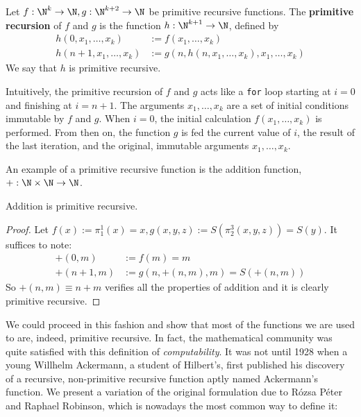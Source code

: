 \documentclass[../main.tex]{memoir}
\begin{document}
\begin{definition}
  Let $f: \N^k \to \N, g: \N^{k + 2} \to \N$ be primitive recursive functions. The \textbf{primitive recursion} of $f$ and $g$ is the function $h: \N^{k + 1} \to \N$, defined by
  \begin{align*}
    h(0, x_1, \ldots, x_k) & := f(x_1, \ldots, x_k) \\
    h(n + 1, x_1, \ldots, x_k) & := g(n, h(n, x_1, \ldots, x_k), x_1, \ldots, x_k)
  \end{align*}
  We say that $h$ is primitive recursive.
\end{definition}

\begin{remark}
  Intuitively, the primitive recursion of $f$ and $g$ acts like a \texttt{for} loop starting at $i = 0$ and finishing at $i = n + 1$. The arguments $x_1, \ldots, x_k$ are a set of initial conditions immutable by $f$ and $g$. When $i = 0$, the initial calculation $f(x_1, \ldots, x_k)$ is performed. From then on, the function $g$ is fed the current value of $i$, the result of the last iteration, and the original, immutable arguments $x_1, \ldots, x_k$.
\end{remark}

An example of a primitive recursive function is the addition function, $+: \N \times \N \to \N$.

\begin{theorem}
  Addition is primitive recursive.
\end{theorem}
\begin{proof}
  Let $f(x) := \pi_1^1(x) = x, g(x, y, z) := S(\pi_2^3(x, y, z)) = S(y)$. It suffices to note:
  \begin{align*}
    +(0, m) & := f(m) = m \\
    +(n + 1, m) & := g(n, +(n, m), m) = S(+(n, m))
  \end{align*}
  So $+(n, m) \equiv n + m$ verifies all the properties of addition and it is clearly primitive recursive.
\end{proof}

We could proceed in this fashion and show that most of the functions we are used to are, indeed, primitive recursive. In fact, the mathematical community was quite satisfied with this definition of \textit{computability}. It was not until 1928 when a young Willhelm Ackermann, a student of Hilbert's, first published \cite{ackermann} his discovery of a recursive, non-primitive recursive function aptly named Ackermann's function. We present a variation of the original formulation due to Rózsa Péter and Raphael Robinson, which is nowadays the most common way to define it:
\end{document}
